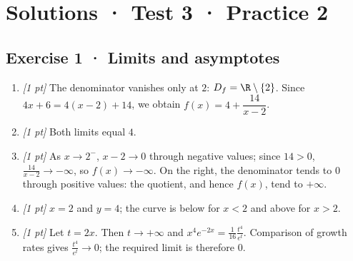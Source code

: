 \ifmxteacher\mxnewpage

\section*{Solutions · Test 3 · Practice 2}\label{cor:4-2}

\subsection*{Exercise 1 · Limits and asymptotes}\begin{enumerate}

\item \textit{[1 pt]} The denominator vanishes only at $2$: $D_f=\R\setminus\{2\}$. Since $4x+6=4(x-2)+14$, we obtain $f(x)=4+\dfrac{14}{x-2}$.

\item \textit{[1 pt]} Both limits equal $4$.

\item \textit{[1 pt]} As $x\to 2^-$, $x-2\to0$ through negative values; since $14>0$, $\frac{14}{x-2}\to-\infty$, so $f(x)\to-\infty$. On the right, the denominator tends to $0$ through positive values: the quotient, and hence $f(x)$, tend to $+\infty$.

\item \textit{[1 pt]} $x=2$ and $y=4$; the curve is below for $x<2$ and above for $x>2$.

\item \textit{[1 pt]} Let $t=2x$. Then $t\to+\infty$ and $x^4e^{-2x}=\frac{1}{16}\frac{t^4}{e^t}$. Comparison of growth rates gives $\frac{t^4}{e^t}\to0$; the required limit is therefore $0$.

\end{enumerate}

